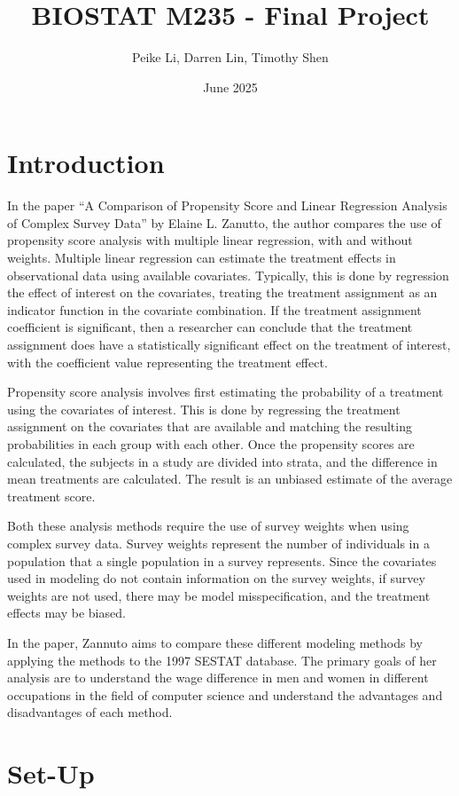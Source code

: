 \documentclass{article}
\title{BIOSTAT M235 - Final Project}
\author{Peike Li, Darren Lin, Timothy Shen}
\date{June 2025}
\begin{document}
\maketitle

\newpage

\section{Introduction}

In the paper “A Comparison of Propensity Score and Linear Regression Analysis of Complex Survey Data” by Elaine L. Zanutto, the author compares the use of propensity score analysis with multiple linear regression, with and without weights.
Multiple linear regression can estimate the treatment effects in observational data using available covariates. Typically, this is done by regression the effect of interest on the covariates, treating the treatment assignment as an indicator function in the covariate combination. If the treatment assignment coefficient is significant, then a researcher can conclude that the treatment assignment does have a statistically significant effect on the treatment of interest, with the coefficient value representing the treatment effect.

Propensity score analysis involves first estimating the probability of a treatment using the covariates of interest. This is done by regressing the treatment assignment on the covariates that are available and matching the resulting probabilities in each group with each other. Once the propensity scores are calculated, the subjects in a study are divided into strata, and the difference in mean treatments are calculated. The result is an unbiased estimate of the average treatment score.

Both these analysis methods require the use of survey weights when using complex survey data. Survey weights represent the number of individuals in a population that a single population in a survey represents. Since the covariates used in modeling do not contain information on the survey weights, if survey weights are not used, there may be model misspecification, and the treatment effects may be biased.

In the paper, Zannuto aims to compare these different modeling methods by applying the methods to the 1997 SESTAT database. The primary goals of her analysis are to understand the wage difference in men and women in different occupations in the field of computer science and understand the advantages and disadvantages of each method.

\section{Set-Up}
\end{document}
